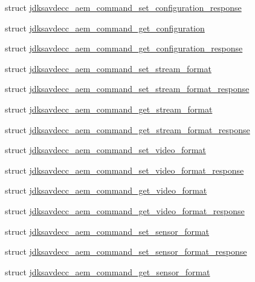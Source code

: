 \begin{DoxyCompactItemize}
\item 
struct \hyperlink{structjdksavdecc__aem__command__set__configuration__response}{jdksavdecc\+\_\+aem\+\_\+command\+\_\+set\+\_\+configuration\+\_\+response}
\item 
struct \hyperlink{structjdksavdecc__aem__command__get__configuration}{jdksavdecc\+\_\+aem\+\_\+command\+\_\+get\+\_\+configuration}
\item 
struct \hyperlink{structjdksavdecc__aem__command__get__configuration__response}{jdksavdecc\+\_\+aem\+\_\+command\+\_\+get\+\_\+configuration\+\_\+response}
\item 
struct \hyperlink{structjdksavdecc__aem__command__set__stream__format}{jdksavdecc\+\_\+aem\+\_\+command\+\_\+set\+\_\+stream\+\_\+format}
\item 
struct \hyperlink{structjdksavdecc__aem__command__set__stream__format__response}{jdksavdecc\+\_\+aem\+\_\+command\+\_\+set\+\_\+stream\+\_\+format\+\_\+response}
\item 
struct \hyperlink{structjdksavdecc__aem__command__get__stream__format}{jdksavdecc\+\_\+aem\+\_\+command\+\_\+get\+\_\+stream\+\_\+format}
\item 
struct \hyperlink{structjdksavdecc__aem__command__get__stream__format__response}{jdksavdecc\+\_\+aem\+\_\+command\+\_\+get\+\_\+stream\+\_\+format\+\_\+response}
\item 
struct \hyperlink{structjdksavdecc__aem__command__set__video__format}{jdksavdecc\+\_\+aem\+\_\+command\+\_\+set\+\_\+video\+\_\+format}
\item 
struct \hyperlink{structjdksavdecc__aem__command__set__video__format__response}{jdksavdecc\+\_\+aem\+\_\+command\+\_\+set\+\_\+video\+\_\+format\+\_\+response}
\item 
struct \hyperlink{structjdksavdecc__aem__command__get__video__format}{jdksavdecc\+\_\+aem\+\_\+command\+\_\+get\+\_\+video\+\_\+format}
\item 
struct \hyperlink{structjdksavdecc__aem__command__get__video__format__response}{jdksavdecc\+\_\+aem\+\_\+command\+\_\+get\+\_\+video\+\_\+format\+\_\+response}
\item 
struct \hyperlink{structjdksavdecc__aem__command__set__sensor__format}{jdksavdecc\+\_\+aem\+\_\+command\+\_\+set\+\_\+sensor\+\_\+format}
\item 
struct \hyperlink{structjdksavdecc__aem__command__set__sensor__format__response}{jdksavdecc\+\_\+aem\+\_\+command\+\_\+set\+\_\+sensor\+\_\+format\+\_\+response}
\item 
struct \hyperlink{structjdksavdecc__aem__command__get__sensor__format}{jdksavdecc\+\_\+aem\+\_\+command\+\_\+get\+\_\+sensor\+\_\+format}

\end{DoxyCompactItemize}
